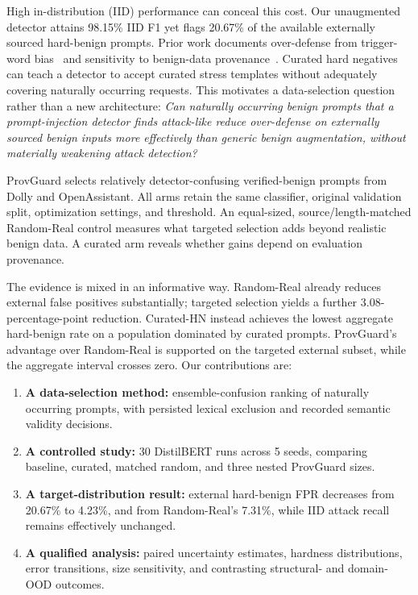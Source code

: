 \documentclass[conference]{IEEEtran}
\newcommand{\BaseIIDPct}{98.15}
\newcommand{\BaseExtPct}{20.67}
\newcommand{\RandExtPct}{7.31}
\newcommand{\PGExtPct}{4.23}
\newcommand{\RandExtDropPP}{3.08}
\newcommand{\NSeeds}{5}
\newcommand{\NRuns}{30}
\begin{document}
High in-distribution (IID) performance can conceal this cost. Our unaugmented detector attains \BaseIIDPct\% IID F1 yet flags \BaseExtPct\% of the available externally sourced hard-benign prompts. Prior work documents over-defense from trigger-word bias~\cite{piguard} and sensitivity to benign-data provenance~\cite{pids}. Curated hard negatives can teach a detector to accept curated stress templates without adequately covering naturally occurring requests. This motivates a data-selection question rather than a new architecture:
\emph{Can naturally occurring benign prompts that a prompt-injection detector finds attack-like reduce over-defense on externally sourced benign inputs more effectively than generic benign augmentation, without materially weakening attack detection?}

ProvGuard selects relatively detector-confusing verified-benign prompts from Dolly and OpenAssistant. All arms retain the same classifier, original validation split, optimization settings, and threshold. An equal-sized, source/length-matched Random-Real control measures what targeted selection adds beyond realistic benign data. A curated arm reveals whether gains depend on evaluation provenance.

The evidence is mixed in an informative way. Random-Real already reduces external false positives substantially; targeted selection yields a further \RandExtDropPP{}-percentage-point reduction. Curated-HN instead achieves the lowest aggregate hard-benign rate on a population dominated by curated prompts. ProvGuard's advantage over Random-Real is supported on the targeted external subset, while the aggregate interval crosses zero. Our contributions are:
\begin{enumerate}
\item \textbf{A data-selection method:} ensemble-confusion ranking of naturally occurring prompts, with persisted lexical exclusion and recorded semantic validity decisions.
\item \textbf{A controlled study:} \NRuns{} DistilBERT runs across \NSeeds{} seeds, comparing baseline, curated, matched random, and three nested ProvGuard sizes.
\item \textbf{A target-distribution result:} external hard-benign FPR decreases from \BaseExtPct\% to \PGExtPct\%, and from Random-Real's \RandExtPct\%, while IID attack recall remains effectively unchanged.
\item \textbf{A qualified analysis:} paired uncertainty estimates, hardness distributions, error transitions, size sensitivity, and contrasting structural- and domain-OOD outcomes.
\end{enumerate}
\end{document}
